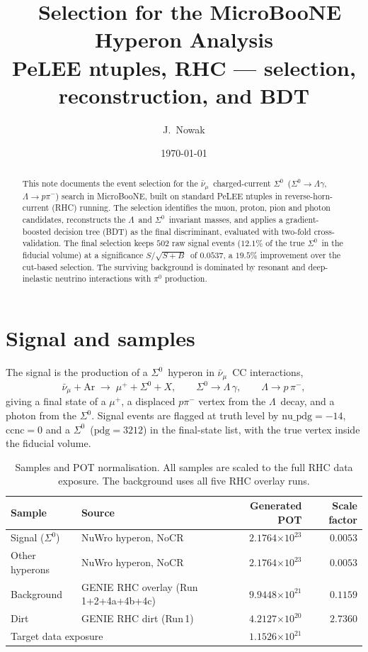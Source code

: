 \documentclass[11pt,a4paper]{article}
\title{\Szero\ Selection for the MicroBooNE Hyperon Analysis\\
\large PeLEE ntuples, RHC --- selection, reconstruction, and BDT}
\author{J.\ Nowak}
\date{\today}
\newcommand{\Szero}{\ensuremath{\Sigma^0}}
\newcommand{\Lam}{\ensuremath{\Lambda}}
\newcommand{\numubar}{\ensuremath{\bar\nu_\mu}}
\newcommand{\FoM}{\ensuremath{S/\sqrt{S+B}}}
\newcommand{\ten}[1]{\ensuremath{\times10^{#1}}}
\begin{document}
\maketitle

\begin{abstract}
This note documents the event selection for the \numubar\ charged-current
\Szero\ ($\Szero\!\to\!\Lam\gamma$, $\Lam\!\to\!p\pi^-$) search in MicroBooNE,
built on standard PeLEE ntuples in reverse-horn-current (RHC) running.
The selection identifies the muon, proton, pion and photon candidates,
reconstructs the \Lam\ and \Szero\ invariant masses, and applies a
gradient-boosted decision tree (BDT) as the final discriminant, evaluated with
two-fold cross-validation. The final selection keeps $502$ raw signal events
($12.1\%$ of the true \Szero\ in the fiducial volume) at a significance \FoM\ of
$0.0537$, a $19.5\%$ improvement over the cut-based selection. The surviving
background is dominated by resonant and deep-inelastic neutrino interactions
with $\pi^0$ production.
\end{abstract}

\section{Signal and samples}
The signal is the production of a \Szero\ hyperon in \numubar\ CC interactions,
\[
  \numubar + \mathrm{Ar} \;\to\; \mu^+ + \Szero + X,\qquad
  \Szero \to \Lam\,\gamma,\qquad \Lam \to p\,\pi^-,
\]
giving a final state of a $\mu^+$, a displaced $p\pi^-$ vertex from the \Lam\
decay, and a photon from the \Szero. Signal events are flagged at truth level by
$\mathrm{nu\_pdg}=-14$, $\mathrm{ccnc}=0$ and a \Szero\ ($\mathrm{pdg}=3212$) in
the final-state list, with the true vertex inside the fiducial volume.

\begin{table}[h]
\centering
\caption{Samples and POT normalisation. All samples are scaled to the full RHC
data exposure. The background uses all five RHC overlay runs.}
\label{tab:samples}
\begin{tabular}{llrr}
\toprule
Sample & Source & Generated POT & Scale factor \\
\midrule
Signal (\Szero) & NuWro hyperon, NoCR & $2.1764\ten{23}$ & $0.0053$ \\
Other hyperons  & NuWro hyperon, NoCR & $2.1764\ten{23}$ & $0.0053$ \\
Background       & GENIE RHC overlay (Run\,1+2+4a+4b+4c) & $9.9448\ten{21}$ & $0.1159$ \\
Dirt            & GENIE RHC dirt (Run\,1) & $4.2127\ten{20}$ & $2.7360$ \\
\midrule
\multicolumn{2}{l}{Target data exposure} & $1.1526\ten{21}$ & \\
\bottomrule
\end{tabular}
\end{table}
\end{document}
